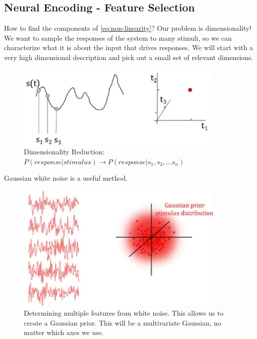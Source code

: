 \documentclass[]{article}
\begin{document}
\subsection{Neural Encoding - Feature Selection}
How to find the components of \eqref{eq:non-linearity}? Our problem is dimensionality! We want to sample the responses of the system to many stimuli, so we can characterize what it is about the input that drives responses. We will start with a very high dimensional description and pick out a small set of relevant dimensions.

\begin{figure}[H]
	\caption[Dimensionality Reduction]{Dimensionality Reduction: $P(response|stimulus)\rightarrow P(response\vert s_1,s_2,...s_n)$}
	\includegraphics[width=0.9\textwidth]{dimenionality-reduction}
\end{figure}

Gaussian white noise is a useful method.

\begin{figure}[H]
	\caption[Determining multiple features from white noise]{Determining multiple features from white noise. This allows us to create a Gaussian prior. This will be a multivariate Gaussian, no matter which axes we use.}\label{fig:determining-multiple-features}
	\includegraphics[width=0.9\textwidth]{white-noise}
\end{figure}
\end{document}
